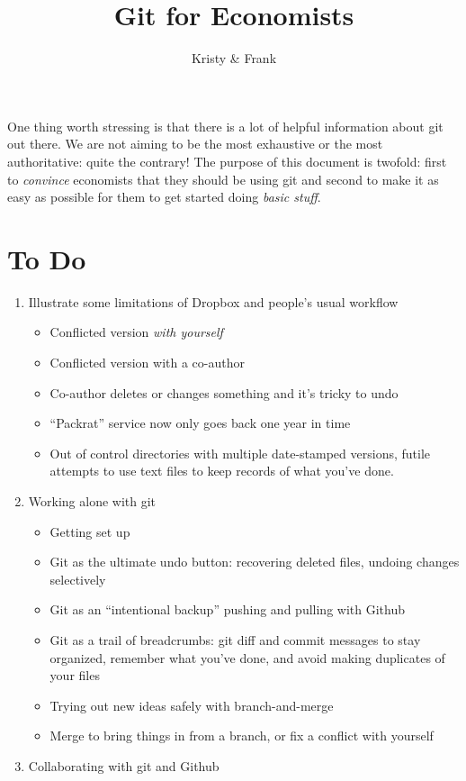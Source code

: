 \documentclass[12pt,letterpaper]{article}
\title{Git for Economists}
\author{Kristy \& Frank}
\begin{document}
\maketitle
One thing worth stressing is that there is a lot of helpful information about git out there.
We are not aiming to be the most exhaustive or the most authoritative: quite the contrary!
The purpose of this document is twofold: first to \emph{convince} economists that they should be using git and second to make it as easy as possible for them to get started doing \emph{basic stuff}.
\section*{To Do}
\begin{enumerate}
	\item Illustrate some limitations of Dropbox and people's usual workflow
		\begin{itemize}
			\item Conflicted version \emph{with yourself}
			\item Conflicted version with a co-author
			\item Co-author deletes or changes something and it's tricky to undo
			\item ``Packrat'' service now only goes back one year in time
			\item Out of control directories with multiple date-stamped versions, futile attempts to use text files to keep records of what you've done.
		\end{itemize}
	\item Working alone with git
		\begin{itemize}
			\item Getting set up
			\item Git as the ultimate undo button: recovering deleted files, undoing changes selectively
			\item Git as an ``intentional backup'' pushing and pulling with Github
			\item Git as a trail of breadcrumbs: git diff and commit messages to stay organized, remember what you've done, and avoid making duplicates of your files
			\item Trying out new ideas safely with branch-and-merge 
			\item Merge to bring things in from a branch, or fix a conflict with yourself
		\end{itemize}
	\item Collaborating with git and Github
		\begin{enumerate}

\end{enumerate}
\end{enumerate}
\end{document}
